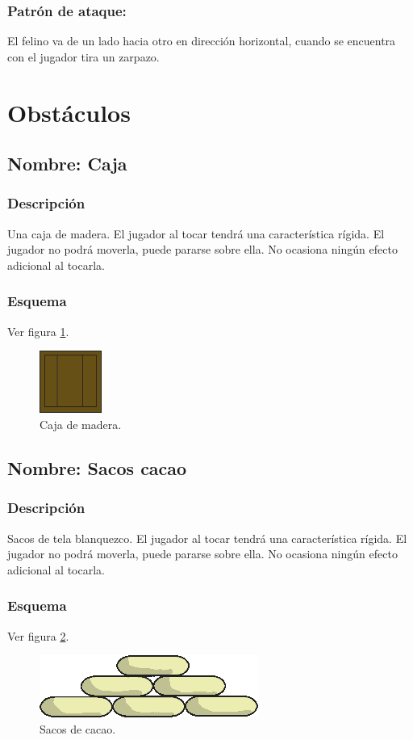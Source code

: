 \documentclass[11pt,letterpaper]{article}
\begin{document}
\subsubsection{Patrón de ataque:}
El felino va de un lado hacia otro en dirección horizontal, cuando se encuentra con el jugador tira un zarpazo.

\section{Obstáculos}
	\subsection{Nombre: Caja} \label{obs.caja}
\subsubsection{Descripción}
Una caja de madera. El jugador al tocar tendrá una característica rígida. El jugador no podrá moverla, puede pararse sobre ella. No ocasiona ningún efecto adicional al tocarla.
\subsubsection{Esquema}
Ver figura \ref{fig:caja}.
\begin{figure}
	\centering
	\includegraphics[height=0.2 \textheight]{Imagenes/caja}
	\caption{Caja de madera.}
	\label{fig:caja}
\end{figure}
	\subsection{Nombre: Sacos cacao}\label{obs.saco}
\subsubsection{Descripción}
Sacos de tela blanquezco. El jugador al tocar tendrá una característica rígida. El jugador no podrá moverla, puede pararse sobre ella. No ocasiona ningún efecto adicional al tocarla.
\subsubsection{Esquema}
Ver figura \ref{fig:saco}.
\begin{figure}
	\centering
	\includegraphics[height=0.2 \textheight]{Imagenes/saco}
	\caption{Sacos de cacao.}
	\label{fig:saco}
\end{figure}
\end{document}
